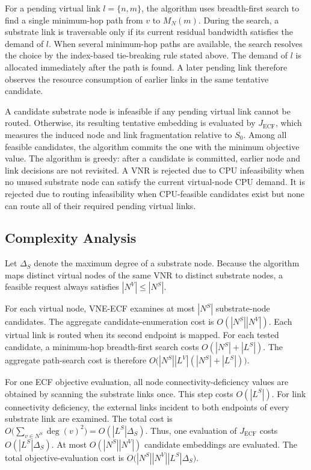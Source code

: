 \documentclass{ieeeaccess}
\newcommand{\ecfvne}{VNE-ECF}
\begin{document}
For a pending virtual link $l=\{n,m\}$, the algorithm uses breadth-first
search to find a single minimum-hop path from $v$ to $M_N(m)$. During the
search, a substrate link is traversable only if its current residual
bandwidth satisfies the demand of $l$. When several minimum-hop paths are
available, the search resolves the choice by the index-based tie-breaking rule stated above.
The demand of $l$ is allocated immediately after the path is found. A later pending link therefore
observes the resource consumption of earlier links in the same tentative candidate.

A candidate substrate node is infeasible if any pending virtual link cannot
be routed. Otherwise, its resulting tentative embedding is evaluated by
$J_{\mathrm{ECF}}$, which measures the induced node and link fragmentation
relative to $S_0$. Among all feasible candidates, the algorithm commits the
one with the minimum objective value. The algorithm is greedy: after a candidate is
committed, earlier node and link decisions are not revisited. A VNR is
rejected due to CPU infeasibility when no unused substrate node can satisfy
the current virtual-node CPU demand. It is rejected due to routing
infeasibility when CPU-feasible candidates exist but none can route all of
their required pending virtual links.

\subsection{Complexity Analysis}

Let $\Delta_S$ denote the maximum degree of a substrate node. Because the algorithm maps distinct
virtual nodes of the same VNR to distinct substrate nodes, a feasible request always satisfies
$|N^V|\le|N^S|$.

For each virtual node, \ecfvne{} examines at most $|N^S|$ substrate-node candidates. The aggregate
candidate-enumeration cost is $O(|N^S||N^V|)$. Each virtual link is routed when its second endpoint
is mapped. For each tested candidate, a minimum-hop breadth-first search costs
$O(|N^S|+|L^S|)$. The aggregate path-search cost is therefore
$O\bigl(|N^S||L^V|(|N^S|+|L^S|)\bigr)$.

For one ECF objective evaluation, all node connectivity-deficiency values are obtained by scanning
the substrate links once. This step costs $O(|L^S|)$. For link connectivity deficiency, the
external links incident to both endpoints of every substrate link are examined. The total cost is
$O\bigl(\sum_{v\in N^S}\deg(v)^2\bigr)=O(|L^S|\Delta_S)$. Thus, one evaluation of
$J_{\mathrm{ECF}}$ costs $O(|L^S|\Delta_S)$. At most $O(|N^S||N^V|)$ candidate embeddings are
evaluated. The total objective-evaluation cost is
$O\bigl(|N^S||N^V||L^S|\Delta_S\bigr)$.
\end{document}
